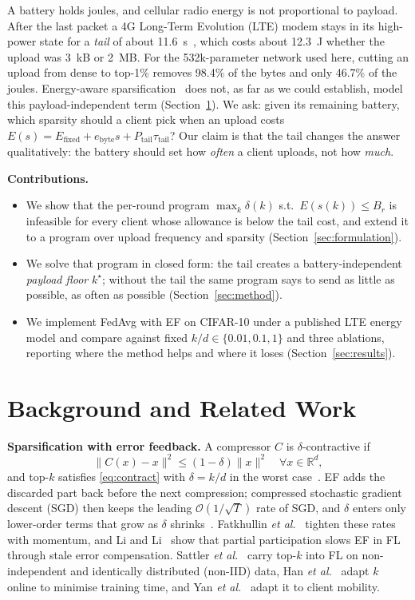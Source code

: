 \documentclass[conference,a4paper]{IEEEtran}
\newcommand{\kst}{k^\star}
\begin{document}
A battery holds joules, and cellular radio energy is not proportional to payload. After the last packet a 4G Long-Term Evolution (LTE) modem stays in its high-power state for a \emph{tail} of about 11.6~s~\cite{huang2012,balasubramanian2009}, which costs about 12.3~J whether the upload was 3~kB or 2~MB. For the 532k-parameter network used here, cutting an upload from dense to top-1\% removes 98.4\% of the bytes and only 46.7\% of the joules. Energy-aware sparsification~\cite{vaishnav2023} does not, as far as we could establish, model this payload-independent term (Section~\ref{sec:related}). We ask: given its remaining battery, which sparsity should a client pick when an upload costs $E(s)=E_{\text{fixed}}+e_{\text{byte}}s+P_{\text{tail}}\tau_{\text{tail}}$? Our claim is that the tail changes the answer qualitatively: the battery should set how \emph{often} a client uploads, not how \emph{much}.

\textbf{Contributions.}
\begin{itemize}
\item We show that the per-round program $\max_k\delta(k)$ s.t.\ $E(s(k))\le B_r$ is infeasible for every client whose allowance is below the tail cost, and extend it to a program over upload frequency and sparsity (Section~\ref{sec:formulation}).
\item We solve that program in closed form: the tail creates a battery-independent \emph{payload floor} $\kst$; without the tail the same program says to send as little as possible, as often as possible (Section~\ref{sec:method}).
\item We implement FedAvg with EF on CIFAR-10 under a published LTE energy model and compare against fixed $k/d\in\{0.01,0.1,1\}$ and three ablations, reporting where the method helps and where it loses (Section~\ref{sec:results}).
\end{itemize}

\section{Background and Related Work}
\label{sec:related}
\textbf{Sparsification with error feedback.} A compressor $C$ is $\delta$-contractive if
\begin{equation}
\|C(x)-x\|^2\le(1-\delta)\|x\|^2\quad\forall x\in\mathbb{R}^d ,
\label{eq:contract}
\end{equation}
and top-$k$ satisfies \eqref{eq:contract} with $\delta=k/d$ in the worst case~\cite{stich2018}. EF adds the discarded part back before the next compression; compressed stochastic gradient descent (SGD) then keeps the leading $\mathcal{O}(1/\sqrt{T})$ rate of SGD, and $\delta$ enters only lower-order terms that grow as $\delta$ shrinks~\cite{karimireddy2019,stich2020}. Fatkhullin \emph{et al.}~\cite{fatkhullin2023} tighten these rates with momentum, and Li and Li~\cite{li2023} show that partial participation slows EF in FL through stale error compensation. Sattler \emph{et al.}~\cite{sattler2020} carry top-$k$ into FL on non-independent and identically distributed (non-IID) data, Han \emph{et al.}~\cite{han2020} adapt $k$ online to minimise training time, and Yan \emph{et al.}~\cite{yan2025} adapt it to client mobility.
\end{document}
